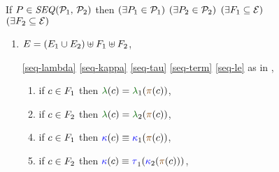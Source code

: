 \begin{figure}
  \renewcommand{\phEvs}{F}
  \raggedright
  
  \noindent
  If $\aPS \in \sSEMI{\aPSS_1}{\aPSS_2}$ then
  $(\exists P_1\in\mathcal{P}_1)$ $(\exists P_2\in\mathcal{P}_2)$
  $(\exists\phEvs_1\subseteq\AllEvents)$ $(\exists\phEvs_2\subseteq\AllEvents)$
  \begin{multicols}{2}
    \begin{enumerate}[topsep=0pt,label=(\textsc{s}\arabic*),ref=\textsc{s}\arabic*]
      \setcounter{enumi}{\value{BE}}
    \item \label{seq-E-phantom}
      $\aEvs=(\aEvs_1\cup\aEvs_2)\uplus\phEvs_1 \uplus\phEvs_2$,

    \item[\eqref{seq-lambda}]
      \eqref{seq-kappa}\;
      \eqref{seq-tau}\;
      \eqref{seq-term}\;
      \eqref{seq-le}\;
      as in ,

      \setcounter{enumi}{\value{lambda}}
    \item[] 
      \begin{enumerate}[leftmargin=0pt]
      \item \label{seq-lambda-phantom1}
        if $\cEv\in \phEvs_1$ then $\labeling(\cEv)=\labeling_1(\fmrg{\cEv})$,
      \item \label{seq-lambda-phantom2}
        if $\cEv\in \phEvs_2$ then $\labeling(\cEv)=\labeling_2(\fmrg{\cEv})$,
      \end{enumerate}

      \setcounter{enumi}{\value{kappa}}
    \item[] 
      \begin{enumerate}[leftmargin=0pt]
        \setcounter{enumii}{3}
      \item \label{seq-kappa-phantom1}
        if $\cEv\in \phEvs_1$ then $\labelingForm(\cEv)\riff\labelingForm_1(\fmrg{\cEv})$,
      \item \label{seq-kappa-phantom2}
        if $\cEv\in \phEvs_2$ then $\labelingForm(\cEv)\riff\aTr[1]{}{\labelingForm_2(\fmrg{\cEv})}$,
      \end{enumerate}


\end{enumerate}
\end{multicols}
\end{figure}
